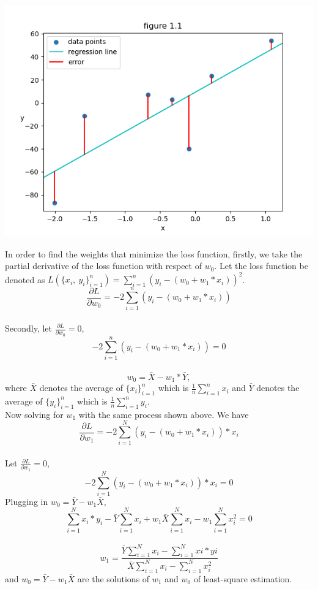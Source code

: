 \documentclass[11pt]{article}
\begin{document}
\begin{center}
\includegraphics[scale=0.7]{figure_1.1}
\end{center}
In order to find the weights that minimize the loss function, firstly, we take the partial derivative of the loss function with respect of $w_0$. Let the loss function be denoted as $L(\{x_i,\ y_i\}_{i=1}^n) = \sum_{i=1}^n (y_i - (w_0+w_1*x_i))^2$.\\
$$\frac{\partial L}{\partial w_0} = -2\sum_{i=1}^n(y_i-(w_0+w_1*x_i))$$\\
Secondly, let $\frac{\partial L}{\partial w_0} = 0$, $$-2\sum_{i=1}^n (y_i - (w_0+w_1*x_i)) =0$$\\
$$w_0 = \bar{X} - w_1 * \bar{Y},$$ where $\bar{X}$ denotes the average of $\{x_i\}_{i=1}^n$ which is $\frac{1}{n}\sum_{i=1}^n x_i$ and $\bar{Y}$ denotes the average of $\{y_i\}_{i=1}^n$ which is $\frac{1}{n}\sum_{i=1}^n y_i$.\\
Now solving for $w_1$ with the same process shown above. We have $$\frac{\partial L}{\partial w_1} =  -2\sum_{i=1}^N(y_i-(w_0+w_1*x_i))*x_i$$\\
Let $\frac{\partial L}{\partial w_1} = 0$, $$-2\sum_{i=1}^N(y_i-(w_0+w_1*x_i))*x_i = 0$$
Plugging in $w_0 = \bar{Y} - w_1\bar{X}$, $$\sum_{i=1}^N x_i*y_i -\bar{Y}\sum_{i=1}^Nx_i+w_1\bar{X}\sum_{i=1}^N x_i - w_1\sum_{i=1}^N x_i^2 = 0$$\\
$$w_1 = \frac{\bar{Y}\sum_{i=1}^N x_i - \sum_{i=1}^N xi*yi}{\bar{X}\sum_{i=1}^N x_i-\sum_{i=1}^Nx_i^2}$$ and $w_0 = \bar{Y} - w_1\bar{X}$ are the solutions of $w_1$ and $w_0$ of least-square estimation.\\
\\
\end{document}
